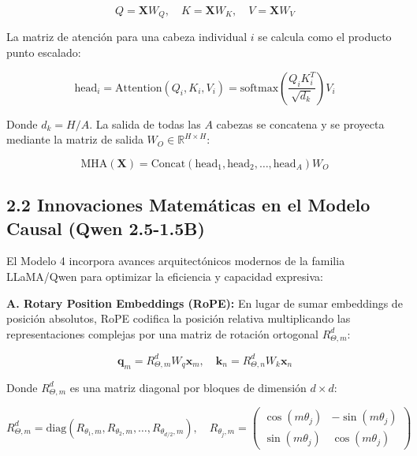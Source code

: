 \begin{equation}
Q = \mathbf{X} W_Q, \quad K = \mathbf{X} W_K, \quad V = \mathbf{X} W_V
\end{equation}

La matriz de atención para una cabeza individual $i$ se calcula como el producto punto escalado:

\begin{equation}
\text{head}_i = \text{Attention}(Q_i, K_i, V_i) = \text{softmax}\left( \frac{Q_i K_i^T}{\sqrt{d_k}} \right) V_i
\end{equation}

Donde $d_k = H / A$. La salida de todas las $A$ cabezas se concatena y se proyecta mediante la matriz de salida $W_O \in \mathbb{R}^{H \times H}$:

\begin{equation}
\text{MHA}(\mathbf{X}) = \text{Concat}(\text{head}_1, \text{head}_2, \dots, \text{head}_A) W_O
\end{equation}

\subsection*{2.2 Innovaciones Matemáticas en el Modelo Causal (Qwen 2.5-1.5B)}

El Modelo 4 incorpora avances arquitectónicos modernos de la familia LLaMA/Qwen para optimizar la eficiencia y capacidad expresiva:

\vspace{0.3cm}

\textbf{A. Rotary Position Embeddings (RoPE):} En lugar de sumar embeddings de posición absolutos, RoPE codifica la posición relativa multiplicando las representaciones complejas por una matriz de rotación ortogonal $R_{\Theta, m}^d$:

\vspace{0.15cm}
\begin{equation}
\mathbf{q}_m = R_{\Theta, m}^d W_q \mathbf{x}_m, \quad \mathbf{k}_n = R_{\Theta, n}^d W_k \mathbf{x}_n
\end{equation}
\vspace{0.15cm}

Donde $R_{\Theta, m}^d$ es una matriz diagonal por bloques de dimensión $d \times d$:

\vspace{0.15cm}
\begin{equation}
R_{\Theta, m}^d = \text{diag}\left( R_{\theta_1, m}, R_{\theta_2, m}, \dots, R_{\theta_{d/2}, m} \right), \quad R_{\theta_j, m} = \begin{pmatrix} \cos(m \theta_j) & -\sin(m \theta_j) \\ \sin(m \theta_j) & \cos(m \theta_j) \end{pmatrix}
\end{equation}
\vspace{0.15cm}

